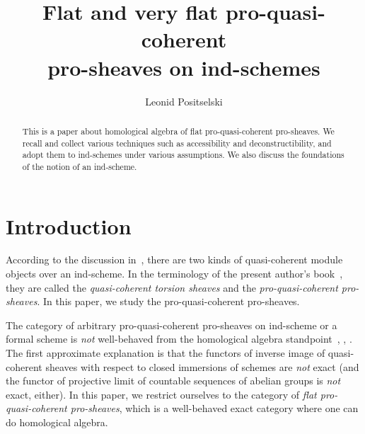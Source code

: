 \documentclass[12pt,a4paper]{amsart}
\newcommand{\+}{\protect\nobreakdash-}
\renewcommand{\:}{\colon}
\theoremstyle{plain}
\theoremstyle{definition}
\begin{document}
\title{Flat and very flat pro-quasi-coherent \\
pro-sheaves on ind-schemes}

\author{Leonid Positselski}

\address{Institute of Mathematics, Czech Academy of Sciences \\
\v Zitn\'a~25, 115~67 Prague~1 \\ Czech Republic} 


\begin{abstract}
 This is a paper about homological algebra of flat
pro-quasi-coherent pro-sheaves.
 We recall and collect various techniques such as accessibility
and deconstructibility, and adopt them to ind-schemes under
various assumptions.
 We also discuss the foundations of the notion of an ind-scheme.
\end{abstract}

\maketitle

\tableofcontents


\section{Introduction}
\bigskip

 According to the discussion in~\cite[Section~7.11]{BD2}, there are
two kinds of quasi-coherent module objects over an ind-scheme.
 In the terminology of the present author's
book~\cite[Chapters~2\+-3]{Psemten}, they are called
the \emph{quasi-coherent torsion sheaves} and
the \emph{pro-quasi-coherent pro-sheaves}.
 In this paper, we study the pro-quasi-coherent pro-sheaves.

 The category of arbitrary pro-quasi-coherent pro-sheaves
on ind-scheme or a formal scheme is \emph{not} well-behaved from
the homological algebra standpoint~\cite[Section~7.11.3]{BD2},
\cite[Examples~3.1 and~3.8(1)]{Psemten}, \cite[Example~2.7(1)]{Pcta}.
 The first approximate explanation is that the functors of inverse
image of quasi-coherent sheaves with respect to closed immersions of
schemes are \emph{not} exact (and the functor of projective limit of
countable sequences of abelian groups is \emph{not} exact, either).
 In this paper, we restrict ourselves to the category of \emph{flat
pro-quasi-coherent pro-sheaves}, which is a well-behaved exact
category where one can do homological algebra.
\end{document}
